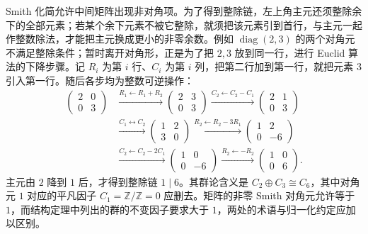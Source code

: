\ProseParagraphBreak
Smith 化简允许中间矩阵出现非对角项。为了得到整除链，左上角主元还须整除余下的全部元素；若某个余下元素不被它整除，就须把该元素引到首行，与主元一起作整数除法，才能把主元换成更小的非零余数。例如 \(\operatorname{diag}(2,3)\) 的两个对角元不满足整除条件；暂时离开对角形，正是为了把 \(2,3\) 放到同一行，进行 Euclid 算法的下降步骤。记 \(R_i\) 为第 \(i\) 行、\(C_i\) 为第 \(i\) 列，把第二行加到第一行，就把元素 \(3\) 引入第一行。随后各步均为整数可逆操作：
\[
	\begin{aligned}
		\begin{pmatrix}2&0\\0&3\end{pmatrix}
		&\xrightarrow{R_1\leftarrow R_1+R_2}
		\begin{pmatrix}2&3\\0&3\end{pmatrix}
		\xrightarrow{C_2\leftarrow C_2-C_1}
		\begin{pmatrix}2&1\\0&3\end{pmatrix}\\[1ex]
		&\xrightarrow{C_1\leftrightarrow C_2}
		\begin{pmatrix}1&2\\3&0\end{pmatrix}
		\xrightarrow{R_2\leftarrow R_2-3R_1}
		\begin{pmatrix}1&2\\0&-6\end{pmatrix}\\[1ex]
		&\xrightarrow{C_2\leftarrow C_2-2C_1}
		\begin{pmatrix}1&0\\0&-6\end{pmatrix}
		\xrightarrow{R_2\leftarrow -R_2}
		\begin{pmatrix}1&0\\0&6\end{pmatrix}.
	\end{aligned}
\]
主元由 \(2\) 降到 \(1\) 后，才得到整除链 \(1\mid6\)。其群论含义是 \(C_2\oplus C_3\cong C_6\)，其中对角元 \(1\) 对应的平凡因子 \(C_1=\mathbb Z/\mathbb Z=0\) 应删去。矩阵的非零 Smith 对角元允许等于 \(1\)，而结构定理中列出的群的不变因子要求大于 \(1\)，两处的术语与归一化约定应加以区别。

